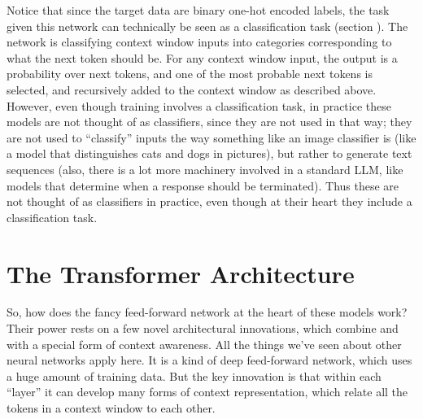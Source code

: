 Notice that since the target data are binary one-hot encoded labels, the task given this network can technically be seen as a classification task (section ). The network is classifying context window inputs into categories corresponding to what the next token should be.  For any context window input, the output is a probability over next tokens, and one of the most probable next tokens is selected, and recursively added to the context window as described above. However, even though training involves a classification task, in practice these models are not thought of as classifiers, since they are not used in that way; they are not used to ``classify'' inputs the way something like an image classifier is (like a model that distinguishes cats and dogs in pictures), but rather to generate text sequences (also, there is a lot more machinery involved in a standard LLM, like models that determine when a response should be terminated). Thus these are not thought of as classifiers in practice, even though at their heart they include a classification task.

\section{The Transformer Architecture}\label{transformers}


So, how does the fancy feed-forward network at the heart of these models work? Their power rests on a few novel architectural innovations, which combine  and  with a special form of context awareness. All the things we've seen about other neural networks apply here. It is a kind of deep feed-forward network, which uses a huge amount of training data. But the key innovation is that within each ``layer'' it can develop many forms of context representation, which relate all the tokens in a context window to each other.

